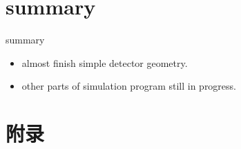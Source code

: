 \documentclass[11pt,compress,xcolor=x11names,UTF8]{beamer}
\begin{document}
\section{summary}

\begin{frame}{summary}
\begin{itemize}
\item  almost finish simple detector geometry.
\item  other parts of simulation program still in progress.
\end{itemize}
\end{frame}


\begin{frame}
\end{frame}

%
%

\appendix

\section*{附录}




\end{document}
